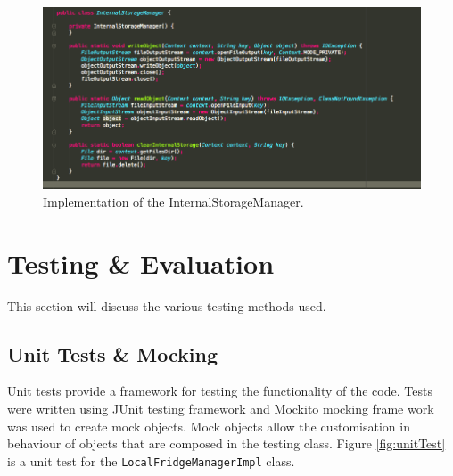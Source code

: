 \documentclass[a4paper, 11pt]{article}
\begin{document}
\begin{figure}[!htbp]
\centering
\includegraphics[width=\textwidth]{serializable}
\caption{Implementation of the InternalStorageManager.}\label{fig:serializable}
\end{figure}
\clearpage


\section{Testing \& Evaluation}
This section will discuss the various testing methods used.

\subsection{Unit Tests \& Mocking} Unit tests provide a framework for testing the functionality of the code. Tests were written using JUnit testing framework and Mockito mocking frame work was used to create mock objects. Mock objects allow the customisation in behaviour of objects that are composed in the testing class. Figure \ref{fig:unitTest} is a unit test for the \texttt{LocalFridgeManagerImpl} class. 
  
\vspace{\baselineskip}
\end{document}
